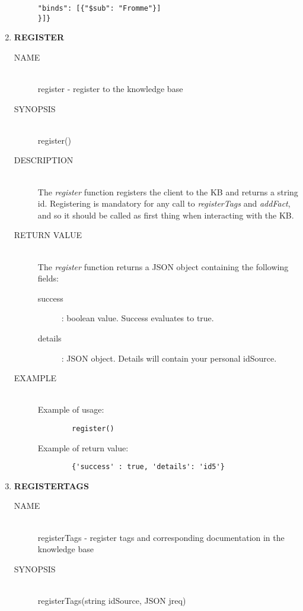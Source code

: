 \documentclass{article}
\begin{document}
\begin{enumerate}
\begin{description}
\begin{lstlisting}
"binds": [{"$sub": "Fromme"}]
}]}
        \end{lstlisting}
        \end{description}
    \item \textbf{\large{REGISTER}}
        \begin{description}
        \item[NAME] \hfill \\ 
        register - register to the knowledge base
    	\item[SYNOPSIS] \hfill \\
    	register()
    	\item[DESCRIPTION] \hfill \\
    	The \textit{register} function registers the client to the KB and returns a string id. Registering is mandatory for any call to \textit{registerTags} and \textit{addFact}, and so it should be called as first thing when interacting with the KB.
    
        \item[RETURN VALUE] \hfill \\
        The \textit{register} function returns a JSON object containing the following fields:
    	\begin{description} 
    	    \item [success] : boolean value. Success evaluates to true.
    		\item [details] : JSON object. Details will contain your personal idSource.
        \end{description}
        \item[EXAMPLE] \hfill \\
    	Example of usage:
    	\begin{lstlisting}
    	register()
    	\end{lstlisting}
    	Example of return value:
        \begin{lstlisting}
    	{'success' : true, 'details': 'id5'}
        \end{lstlisting}
        \end{description}
    \item \textbf{REGISTERTAGS}
        \begin{description}
        \item[NAME] \hfill \\
        registerTags - register tags and corresponding documentation in the knowledge base
    	\item[SYNOPSIS] \hfill \\
    	registerTags(string idSource, JSON jreq)
    	

\end{description}
\end{enumerate}
\end{document}
